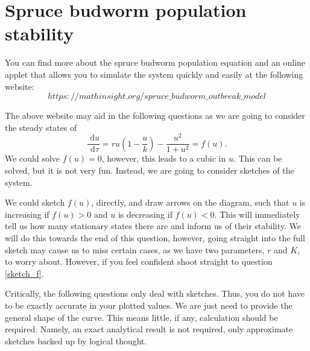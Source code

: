 \documentclass[]{article}
\newcommand{\bb}{\begin{equation}}
\newcommand{\ee}{\end{equation}}
\newcommand{\rd}{\text{ d}}
\renewcommand{\l}{\left(}
\renewcommand{\r}{\right)}
\begin{document}
\section{Spruce budworm population stability}
You can find more about the spruce budworm population equation and an online applet that allows you to simulate the system quickly and easily at the following website:
\bb
https://mathinsight.org/spruce\_budworm\_outbreak\_model
\ee

The above website may aid in the following questions as we are going to consider the steady states of
\bb
\frac{\rd u}{\rd \tau}=ru\l 1-\frac{u}{k}\r-\frac{u^2}{1+u^2}=f(u).\label{Spruce}
\ee
We could solve $f(u)=0$, however, this leads to a cubic in $u$. This can be solved, but it is not very fun. Instead, we are going to consider sketches of the system.

We could sketch $f(u)$, directly, and draw arrows on the diagram, such that $u$ is increasing if $f(u)>0$ and $u$ is decreasing if $f(u)<0$. This will immediately tell us how many stationary states there are and inform us of their stability. We will do this towards the end of this question, however, going straight into the full sketch may cause us to miss certain cases, as we have two parameters, $r$ and $K$, to worry about. However, if you feel confident shoot straight to question \ref{sketch_f}.

Critically, the following questions only deal with sketches. Thus, you do not have to be exactly accurate in your plotted values. We are just need to provide the general shape of the curve. This means little, if any, calculation should be required. Namely, an exact analytical result is not required, only approximate sketches backed up by logical thought.
\end{document}
